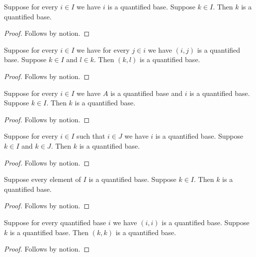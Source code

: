 

\begin{theorem}\label{quantified_member_proof}
    Suppose for every $i\in I$ we have $i$ is a quantified base.
    Suppose $k\in I$.
    Then $k$ is a quantified base.
\end{theorem}
\begin{proof}
    Follows by notion.
\end{proof}

\begin{theorem}\label{quantified_dependent_members}
    Suppose for every $i\in I$ we have for every $j\in i$ we have $(i,j)$ is a quantified base.
    Suppose $k\in I$ and $l\in k$.
    Then $(k,l)$ is a quantified base.
\end{theorem}
\begin{proof}
    Follows by notion.
\end{proof}

\begin{theorem}\label{quantified_result_projection}
    Suppose for every $i\in I$ we have $A$ is a quantified base and $i$ is a quantified base.
    Suppose $k\in I$.
    Then $k$ is a quantified base.
\end{theorem}
\begin{proof}
    Follows by notion.
\end{proof}

\begin{theorem}\label{quantified_repeated_guards}
    Suppose for every $i\in I$ such that $i\in J$ we have $i$ is a quantified base.
    Suppose $k\in I$ and $k\in J$.
    Then $k$ is a quantified base.
\end{theorem}
\begin{proof}
    Follows by notion.
\end{proof}

\begin{theorem}\label{quantified_noun_term}
    Suppose every element of $I$ is a quantified base.
    Suppose $k\in I$.
    Then $k$ is a quantified base.
\end{theorem}
\begin{proof}
    Follows by notion.
\end{proof}

\begin{theorem}\label{quantified_noun_binder}
    Suppose for every quantified base $i$ we have $(i,i)$ is a quantified base.
    Suppose $k$ is a quantified base.
    Then $(k,k)$ is a quantified base.
\end{theorem}
\begin{proof}
    Follows by notion.
\end{proof}
